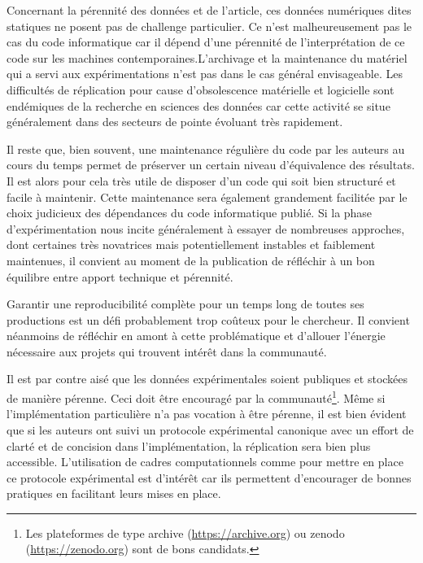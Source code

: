 Concernant la pérennité des données et de l'article, ces données numériques dites \og statiques \fg ne posent pas de challenge particulier. Ce n'est malheureusement pas le cas du code informatique car il dépend d'une pérennité de l'interprétation de ce code sur les machines contemporaines.L'archivage et la maintenance du matériel qui a servi aux expérimentations n'est pas dans le cas général envisageable. Les difficultés de réplication pour cause d'obsolescence matérielle et logicielle sont endémiques de la recherche en sciences des données car cette activité se situe généralement dans des secteurs de pointe évoluant très rapidement.

Il reste que, bien souvent, une maintenance régulière du code par les auteurs au cours du temps permet de préserver un certain niveau d'équivalence des résultats. Il est alors pour cela très utile de disposer d'un code qui soit bien structuré et facile à maintenir. Cette maintenance sera également grandement facilitée par le choix judicieux des dépendances du code informatique publié. Si la phase d'expérimentation nous incite généralement à essayer de nombreuses approches, dont certaines très novatrices mais potentiellement instables et faiblement maintenues, il convient au moment de la publication de réfléchir à un bon équilibre entre apport technique et pérennité.

Garantir une reproducibilité complète pour un temps long de toutes ses productions est un défi probablement trop coûteux pour le chercheur. Il convient néanmoins de réfléchir en amont à cette problématique et d'allouer l'énergie nécessaire aux projets qui trouvent intérêt dans la communauté.

Il est par contre aisé que les données expérimentales soient publiques et stockées de manière pérenne. Ceci doit être encouragé par la communauté\footnote{Les plateformes de type \textsf
{archive} (\url{https://archive.org}) ou \textsf
{zenodo} (\url{https://zenodo.org}) sont de bons candidats.}. Même si l'implémentation particulière n'a pas vocation à être pérenne, il est bien évident que si les auteurs ont suivi un protocole expérimental canonique avec un effort de clarté et de concision dans l'implémentation, la réplication sera bien plus accessible. L'utilisation de cadres computationnels comme \explanes pour mettre en place ce protocole expérimental est d'intérêt car ils permettent d'encourager de bonnes pratiques en facilitant leurs mises en place.
